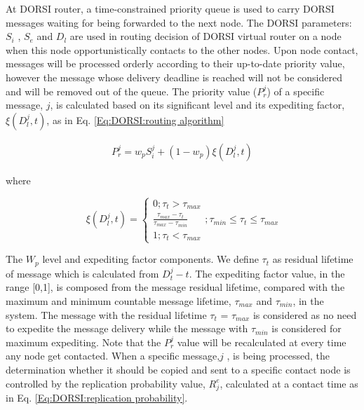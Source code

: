 At DORSI router, a time-constrained priority queue is used to carry DORSI messages waiting for being forwarded to the next node. 
The DORSI parameters: $S_i$ , $S_e$ and $D_l$ are used in routing decision of DORSI virtual router on a node when this node opportunistically contacts to the other nodes. 
Upon node contact, messages will be processed orderly according to their up-to-date priority value, however the message whose delivery deadline is reached will not be considered and will be removed out of the queue. 
The priority value ($P_r^j$) of a specific message, $j$, is calculated based on its significant level and its expediting factor, $\xi(D_l^j, t)$, as in Eq. \ref{Eq:DORSI:routing algorithm}

\begin{eqnarray}
\label{Eq:DORSI:routing algorithm}
{ P }_{ r }^{ j }={ w }_{ p }{ S }_{ i }^{ j }+(1-{ w }_{ p })\xi ({ D }_{ l }^{ j },t)
\end{eqnarray}

where

\begin{equation*}
 \xi ({ D }_{ l }^{ j },t)=\begin{cases} 0;{ \tau  }_{ t }>{ \tau  }_{ max } \\ \frac { { \tau  }_{ max }-{ \tau  }_{ t } }{ { \tau  }_{ max }-{ \tau  }_{ min } }  \\ 1;{ \tau  }_{ t }<{ \tau  }_{ max } \end{cases};{ \tau  }_{ min }\le { \tau  }_{ t }\le { \tau  }_{ max } 	
\end{equation*}

The $W_p$ level and expediting factor components.
We define $\tau_t$ as residual lifetime of message which is calculated from $D_t^j - t$. 
The expediting factor value, in the range [0,1], is composed from the message
residual lifetime, compared with the maximum and minimum countable message lifetime, $\tau_{max}$ and $\tau_{min}$, in the system. 
The message with the residual lifetime $\tau_t$ = $\tau_{max}$ is considered as no need to expedite the message delivery while the message with $\tau_{min}$ is considered for maximum expediting.
Note that the $P_r^j$ value will be recalculated at every time any node get contacted. 
When a specific message,$j$ , is being processed, the determination whether it should be copied and sent to a specific contact node is controlled by the replication probability value, $R_j^e$, calculated at a contact time as in Eq. \ref{Eq:DORSI:replication probability}.


